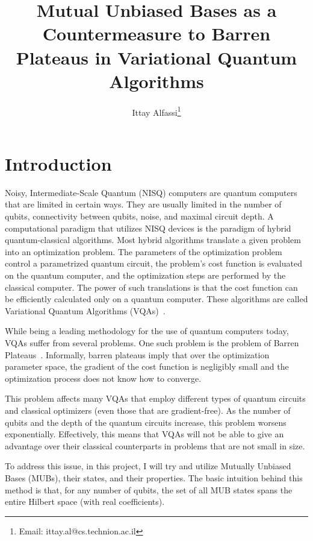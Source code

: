 \documentclass[a4paper,12pt]{article}
\title{Mutual Unbiased Bases as a Countermeasure to Barren Plateaus in Variational Quantum Algorithms}
\author{Ittay Alfassi\footnote{Email: ittay.al@cs.technion.ac.il}}
\begin{document}
\maketitle

\thispagestyle{fancy}

\tableofcontents

\section{Introduction}
Noisy, Intermediate-Scale Quantum (NISQ) computers are quantum computers that are limited in certain ways. They are usually limited in the number of qubits, connectivity between qubits, noise, and maximal circuit depth.
A computational paradigm that utilizes NISQ devices is the paradigm of hybrid quantum-classical algorithms.
Most hybrid algorithms translate a given problem into an optimization problem.
The parameters of the optimization problem control a parametrized quantum circuit, the problem's cost function is evaluated on the quantum computer, and the optimization steps are performed by the classical computer. The power of such translations is that the cost function can be efficiently calculated only on a quantum computer. These algorithms are called Variational Quantum Algorithms (VQAs)~\cite{Cerezo2021}.

While being a leading methodology for the use of quantum computers today, VQAs suffer from several problems. One such problem is the problem of Barren Plateaus~\cite{mcclean_barren_2018}. Informally, barren plateaus imply that over the optimization parameter space, the gradient of the cost function is negligibly small and the optimization process does not know how to converge.

This problem affects many  VQAs that employ different types of quantum circuits and classical optimizers (even those that are gradient-free). As the number of qubits and the depth of the quantum circuits increase, this problem worsens exponentially.
Effectively, this means that VQAs will not be able to give an advantage over their classical counterparts in problems that are not small in size.

To address this issue, in this project, I will try and utilize Mutually Unbiased Bases (MUBs), their states, and their properties.
The basic intuition behind this method is that, for any number of qubits, the set of all MUB states spans the entire Hilbert space (with real coefficients).
\end{document}
